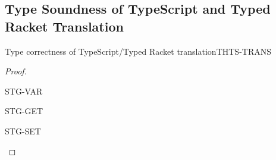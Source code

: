 \documentclass[acmlarge, anonymous, authordraft]{acmart}
\begin{document}
\subsection{Type Soundness of TypeScript and Typed Racket Translation}

\begin{lemma}{Type correctness of TypeScript/Typed Racket translation}{THTS-TRANS}
  \begin{conds}
    \cond{$\TR\K = \Kp$}
    \cond{$\TR\Env = \Envp$}
  \end{conds}

  \then\axiom{$\EnvType\Envp\cdot\Kp{\TRG{\e}\Env}{\any}$}

  \begin{proof} 

    \begin{case}{STG-VAR}
      
    \end{case}

    \begin{case}{STG-GET}
    \end{case}

    \begin{case}{STG-SET}
      \slet{\ep}{\TRG\e\Env}
      \slet{\epp}{{\TAG\e\Env{\t}}}
    \end{case}


\end{proof}
\end{lemma}
\end{document}
